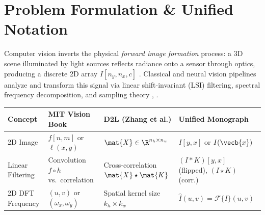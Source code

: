 \documentclass[../../../../master.tex]{subfiles}
\begin{document}

\section{Problem Formulation \& Unified Notation}

Computer vision inverts the physical \emph{forward image formation} process: a 3D scene illuminated by light sources reflects radiance onto a sensor through optics, producing a discrete 2D array $I[n_y, n_x, c]$ . Classical and neural vision pipelines analyze and transform this signal via linear shift-invariant (LSI) filtering, spectral frequency decomposition, and sampling theory , .

\begin{crossbook}
\begin{center}
\footnotesize
\begin{tabularx}{\linewidth}{@{} >{\raggedright\arraybackslash}p{2.5cm} >{\raggedright\arraybackslash}X >{\raggedright\arraybackslash}X >{\raggedright\arraybackslash}X @{}}
\toprule
\textbf{Concept} & \textbf{MIT Vision Book} & \textbf{D2L (Zhang et al.)} & \textbf{Unified Monograph} \\
\midrule
2D Image & $f[n,m]$ or $\ell(x,y)$ & $\mat{X} \in \R^{n_h \times n_w}$ & $I[y,x]$ or $I(\vecb{x})$ \\
Linear Filtering & Convolution $f \circ h$ vs.\ correlation & Cross-correlation $\mat{X} \star \mat{K}$ & $(I * K)[y,x]$ (flipped), $(I \star K)$ (corr.) \\
2D DFT Frequency & $(u, v)$ or $(\omega_x, \omega_y)$ & Spatial kernel size $k_h \times k_w$ & $\hat{I}(u,v) = \mathcal{F}\{I\}(u,v)$ \\
\bottomrule
\end{tabularx}
\end{center}
\end{crossbook}
\end{document}
